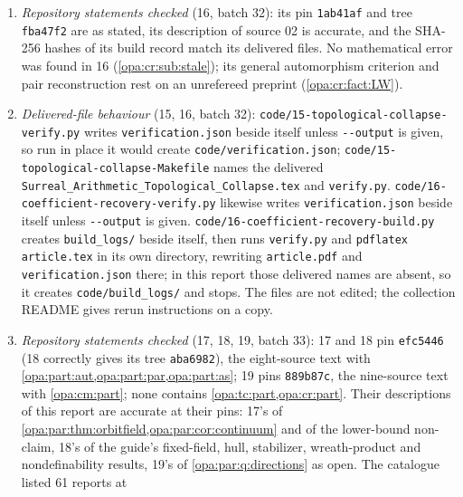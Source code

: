 \documentclass[11pt,oneside]{article}
\numberwithin{equation}{section}
\theoremstyle{definition}
\theoremstyle{remark}
\newcommand{\fn}[1]{\nolinkurl{#1}}
\begin{document}
\begin{enumerate}[itemsep=2pt]
report's source; \texttt{059939b5} is the file written in \texttt{b3fa9e2} and \texttt{60f3b172} the file
written in \texttt{20c4c9f}, and its three audit blobs are those of \texttt{21375f8}. Its statements that
\cref{opa:q:strong} was open in the first and answered by 12 and 13 in the second, and that the inspected
audits do not contain its topological classification, are accurate. Its reading omitted
\cref{opa:cm:part} and the congruence topologies of the neighbouring reports (\cref{opa:tc:sub:source}). No
mathematical error was found in 15 (\cref{opa:tc:sub:stale}).
\item \emph{Repository statements checked} (16, batch 32): its pin \texttt{1ab41af} and tree \texttt{fba47f2}
are as stated, its description of source 02 is accurate, and the SHA-256 hashes of its build record
match its delivered files. No mathematical error was found in 16 (\cref{opa:cr:sub:stale}); its general
automorphism criterion and pair reconstruction rest on an unrefereed preprint (\cref{opa:cr:fact:LW}).
\item \emph{Delivered-file behaviour} (15, 16, batch 32): \fn{code/15-topological-collapse-verify.py}
writes \fn{verification.json} beside itself unless \fn{--output} is given, so run in place it would
create \fn{code/verification.json}; \fn{code/15-topological-collapse-Makefile} names the delivered
\fn{Surreal_Arithmetic_Topological_Collapse.tex} and \fn{verify.py}.
\fn{code/16-coefficient-recovery-verify.py} likewise writes \fn{verification.json} beside itself unless
\fn{--output} is given. \fn{code/16-coefficient-recovery-build.py} creates \fn{build_logs/} beside itself,
then runs \fn{verify.py} and \fn{pdflatex article.tex} in its own directory, rewriting \fn{article.pdf} and
\fn{verification.json} there; in this report those delivered names are absent, so it creates
\fn{code/build_logs/} and stops. The files are not edited; the collection README gives rerun instructions
on a copy.
\item \emph{Repository statements checked} (17, 18, 19, batch 33): 17 and 18 pin \texttt{efc5446} (18 correctly gives its tree
\texttt{aba6982}), the eight-source text with \cref{opa:part:aut,opa:part:par,opa:part:as}; 19 pins \texttt{889b87c}, the nine-source
text with \cref{opa:cm:part}; none contains \cref{opa:tc:part,opa:cr:part}. Their descriptions of this report are accurate at their pins:
17's of \cref{opa:par:thm:orbitfield,opa:par:cor:continuum} and of the lower-bound non-claim, 18's of the guide's fixed-field, hull,
stabilizer, wreath-product and nondefinability results, 19's of \cref{opa:par:q:directions} as open. The catalogue listed 61 reports at

\end{enumerate}
\end{document}
